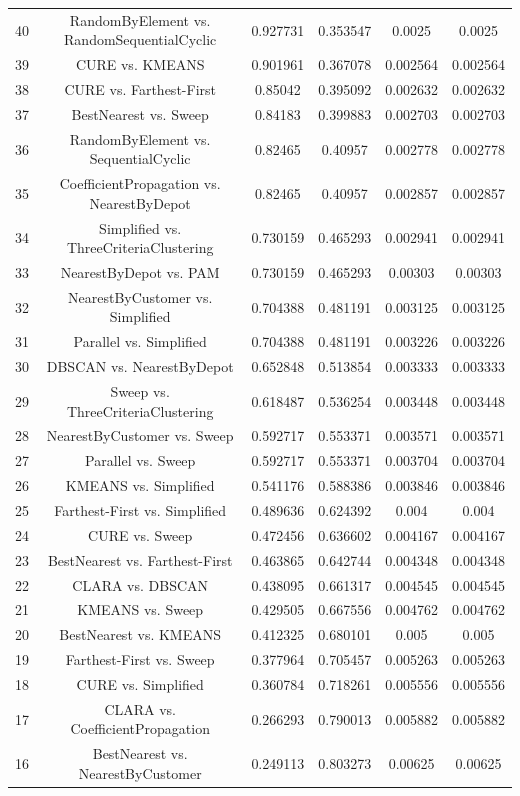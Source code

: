 \documentclass[a4paper,10pt]{article}
\begin{document}
\begin{landscape}
\begin{table}[!htp]
\begin{tabular}{cccccc}
40&RandomByElement vs. RandomSequentialCyclic&0.927731&0.353547&0.0025&0.0025\\
39&CURE vs. KMEANS&0.901961&0.367078&0.002564&0.002564\\
38&CURE vs. Farthest-First&0.85042&0.395092&0.002632&0.002632\\
37&BestNearest vs. Sweep&0.84183&0.399883&0.002703&0.002703\\
36&RandomByElement vs. SequentialCyclic&0.82465&0.40957&0.002778&0.002778\\
35&CoefficientPropagation vs. NearestByDepot&0.82465&0.40957&0.002857&0.002857\\
34&Simplified vs. ThreeCriteriaClustering&0.730159&0.465293&0.002941&0.002941\\
33&NearestByDepot vs. PAM&0.730159&0.465293&0.00303&0.00303\\
32&NearestByCustomer vs. Simplified&0.704388&0.481191&0.003125&0.003125\\
31&Parallel vs. Simplified&0.704388&0.481191&0.003226&0.003226\\
30&DBSCAN vs. NearestByDepot&0.652848&0.513854&0.003333&0.003333\\
29&Sweep vs. ThreeCriteriaClustering&0.618487&0.536254&0.003448&0.003448\\
28&NearestByCustomer vs. Sweep&0.592717&0.553371&0.003571&0.003571\\
27&Parallel vs. Sweep&0.592717&0.553371&0.003704&0.003704\\
26&KMEANS vs. Simplified&0.541176&0.588386&0.003846&0.003846\\
25&Farthest-First vs. Simplified&0.489636&0.624392&0.004&0.004\\
24&CURE vs. Sweep&0.472456&0.636602&0.004167&0.004167\\
23&BestNearest vs. Farthest-First&0.463865&0.642744&0.004348&0.004348\\
22&CLARA vs. DBSCAN&0.438095&0.661317&0.004545&0.004545\\
21&KMEANS vs. Sweep&0.429505&0.667556&0.004762&0.004762\\
20&BestNearest vs. KMEANS&0.412325&0.680101&0.005&0.005\\
19&Farthest-First vs. Sweep&0.377964&0.705457&0.005263&0.005263\\
18&CURE vs. Simplified&0.360784&0.718261&0.005556&0.005556\\
17&CLARA vs. CoefficientPropagation&0.266293&0.790013&0.005882&0.005882\\
16&BestNearest vs. NearestByCustomer&0.249113&0.803273&0.00625&0.00625\\

\end{tabular}
\end{table}
\end{landscape}
\end{document}
